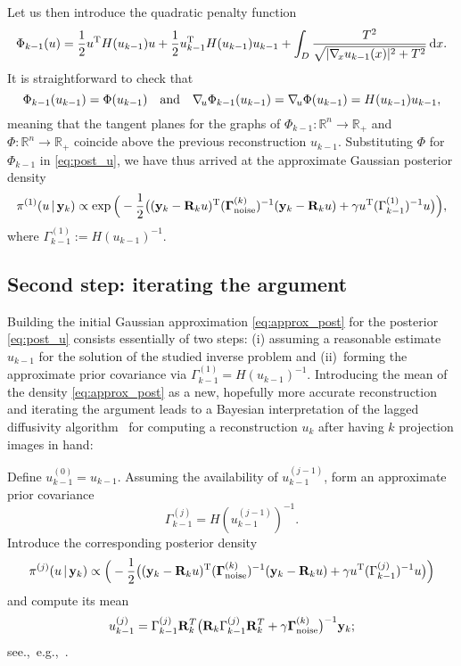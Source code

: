 \documentclass[final]{siamltex}
\newcommand{\R}{\mathbb{R}}
\begin{document}
Let us then introduce the quadratic penalty function
$$
  \Phi_{k-1}(u) = \frac{1}{2} u^{\rm T} H(u_{k-1}) u + \frac{1}{2} u_{k-1}^{\rm T} H(u_{k-1})  u_{k-1} + \int_{D} \frac{T^2}{\sqrt{|\nabla_{\! x} u_{k-1}(x)|^2 + T^2}} \, {\rm d} x.
  $$
It is straightforward to check that
  \begin{equation}
\label{eq:approx}
\Phi_{k-1}(u_{k-1}) = \Phi(u_{k-1}) \quad {\rm and} \quad
\nabla_{\!u} \Phi_{k-1}(u_{k-1}) = \nabla_{\!u} \Phi(u_{k-1}) = H(u_{k-1}) u_{k-1},
\end{equation}
  meaning that the tangent planes
  for the graphs of $\Phi_{k-1}: \R^n \to \R_+$ and $\Phi:  \R^n \to \R_+$ coincide above the previous reconstruction $u_{k-1}$. Substituting $\Phi$ for $\Phi_{k-1}$ in \eqref{eq:post_u}, we have thus arrived at the approximate Gaussian posterior density
\begin{equation}
  \label{eq:approx_post}
  \pi^{(1)}(u \, | \, \mathbf{y}_k) \propto \exp \Big(-\frac{1}{2}  \big( (\mathbf{y}_k - \mathbf{R}_k u )^{\rm T} (\mathbf{\Gamma}_{\rm noise}^{(k)})^{-1}(\mathbf{y}_k - \mathbf{R}_k u ) + \gamma u^{\rm T} (\Gamma_{k-1}^{(1)})^{-1} u \big) \Big),
\end{equation}
where $\Gamma_{k-1}^{(1)} :=  H(u_{k-1})^{-1}$.

\subsection{Second step: iterating the argument}
Building the initial Gaussian approximation \eqref{eq:approx_post} for the posterior \eqref{eq:post_u} consists essentially of two steps: (i) assuming a reasonable estimate $u_{k-1}$ for the solution of the studied inverse problem and (ii)~forming the approximate prior covariance via $\Gamma_{k-1}^{(1)} =  H(u_{k-1})^{-1}$. Introducing the mean of the density \eqref{eq:approx_post} as a new, hopefully more accurate reconstruction and iterating the argument leads to a Bayesian interpretation of the lagged diffusivity algorithm~\cite{Vogel96} for computing a reconstruction $u_k$ after having $k$ projection images in hand:

Define $u_{k-1}^{(0)} = u_{k-1}$. Assuming the availability of $u_{k-1}^{(j-1)}$, form an approximate prior covariance
\begin{equation}
  \label{eq:step1}
\Gamma_{k-1}^{(j)} =  H(u_{k-1}^{(j-1)})^{-1}.
\end{equation}
Introduce the corresponding posterior density
\begin{equation}
  \label{eq:approx_post2}
\pi^{(j)}(u \, | \, \mathbf{y}_k) \propto \Big(-\frac{1}{2}  \big( (\mathbf{y}_k - \mathbf{R}_k u )^{\rm T} (\mathbf{\Gamma}_{\rm noise}^{(k)})^{-1}(\mathbf{y}_k - \mathbf{R}_k u ) + \gamma u^{\rm T} (\Gamma_{k-1}^{(j)})^{-1} u \big) \Big)
\end{equation}
and compute its mean
\begin{equation}
  \label{eq:step2}
 u_{k-1}^{(j)} =  \Gamma_{k-1}^{(j)} \mathbf{R}_k^T \big(\mathbf{R}_k \Gamma_{k-1}^{(j)} \mathbf{R}_k^T + \gamma \bm{\Gamma}_{\rm noise}^{(k)}  \big)^{-1}\mathbf{y}_k;
\end{equation}
see.,~e.g.,~\cite{Kaipio06}.
\end{document}
